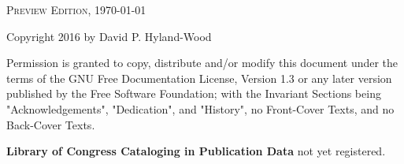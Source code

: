 \documentclass[12pt]{book} %
\begin{document}
\begin{titlepage}

\begin{figure}[htbp]
\begin{center}
\end{center}
\end{figure}


\end{titlepage}

\pagestyle{empty}

\begin{titlepage}
\vspace*{\fill}
\noindent
\textsc{Preview Edition, \today}

\vspace{5 mm}
\noindent
Copyright \textcopyright { }2016 by David P. Hyland-Wood

\vspace{5 mm}
\noindent
Permission is granted to copy, distribute and/or modify this document
under the terms of the GNU Free Documentation License, Version 1.3
or any later version published by the Free Software Foundation;
with the Invariant Sections being  "Acknowledgements", "Dedication",
and "History", no Front-Cover Texts, and no Back-Cover Texts.

\vspace{5 mm}
\noindent
\textbf{Library of Congress Cataloging in Publication Data} not yet registered.

\end{titlepage}

\pagestyle{empty}

\end{document}
